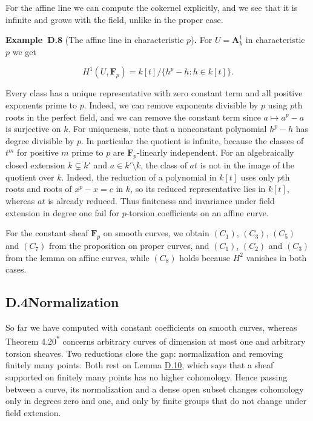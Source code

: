 \documentclass[11pt]{article}
\newenvironment{bpstatement}[2]{\par\addvspace{0.6\baselineskip}\noindent\textbf{#1}#2\textbf{.}\enspace\ignorespaces}
  {\par\addvspace{0.4\baselineskip}}
\newcommand{\bpout}[1]{#1\textsuperscript{\hyperlink{bp-outside}{\ensuremath{\ast}}}}
\begin{document}
\label{bp25}%
For the affine line we can compute the cokernel explicitly, and we see that it is infinite and grows with the field, unlike in the proper case.

\label{bp26}%
\begin{bpstatement}{Example~D.8}{ (The affine line in characteristic $p$)}
For \(U=\mathbf A^1_k\) in characteristic \(p\) we get

\[
H^1(U,\mathbf F_p)=k[t]/\{h^p-h:h\in k[t]\}.
\]

Every class has a unique representative with zero constant term and all positive exponents prime to \(p\).  Indeed, we can remove exponents divisible by \(p\) using \(p\)th roots in the perfect field, and we can remove the constant term since \(a\mapsto a^p-a\) is surjective on \(k\). For uniqueness, note that a nonconstant polynomial \(h^p-h\) has degree divisible by \(p\).  In particular the quotient is infinite, because the classes of \(t^m\) for positive \(m\) prime to \(p\) are \(\mathbf F_p\)-linearly independent.  For an algebraically closed extension \(k\subsetneq k'\) and \(a\in k'\setminus k\), the class of \(at\) is not in the image of the quotient over \(k\). Indeed, the reduction of a polynomial in \(k[t]\) uses only \(p\)th roots and roots of \(x^p-x=c\) in \(k\), so its reduced representative lies in \(k[t]\), whereas \(at\) is already reduced. Thus finiteness and invariance under field extension in degree one fail for \(p\)-torsion coefficients on an affine curve.
\end{bpstatement}

\label{bp27}%
For the constant sheaf \(\mathbf F_p\) on smooth curves, we obtain \((C_1)\), \((C_3)\), \((C_5)\) and \((C_7)\) from the proposition on proper curves, and \((C_1)\), \((C_2)\) and \((C_3)\) from the lemma on affine curves, while \((C_8)\) holds because \(H^2\) vanishes in both cases.


\subsection*{\texorpdfstring{D.4\quad Normalization}{D.4 Normalization}}
\label{bp28}%
\label{bp29}%
So far we have computed with constant coefficients on smooth curves, whereas Theorem \bpout{4.20} concerns arbitrary curves of dimension at most one and arbitrary torsion sheaves. Two reductions close the gap: normalization and removing finitely many points. Both rest on Lemma \hyperref[bp33]{D.10}, which says that a sheaf supported on finitely many points has no higher cohomology. Hence passing between a curve, its normalization and a dense open subset changes cohomology only in degrees zero and one, and only by finite groups that do not change under field extension.
\end{document}
